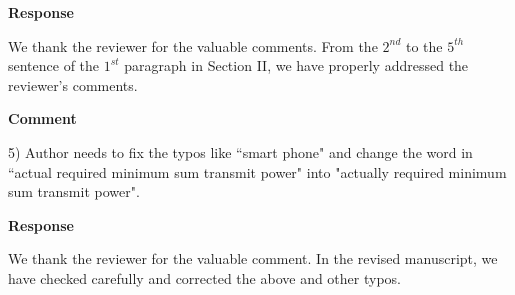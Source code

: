 \documentclass[12pt,draftcls, onecolumn]{IEEEtran}
\begin{document}
\vspace{3mm} \noindent\textcolor[rgb]{0.00,0.00,1.00}{\textbf{Response}}
\vspace{2mm}

We thank the reviewer for the valuable comments. From the $ 2^{nd} $ to the $ 5^{th} $ sentence of the $ 1^{st} $ paragraph in Section II, we have properly addressed the reviewer's comments.


\vspace{3mm}
\noindent\textcolor[rgb]{1.00,0.00,0.00}{\textbf{Comment}}
\vspace{3mm}

5) Author needs to fix the typos like ``smart phone" and change the word in ``actual required minimum sum transmit power" into "actually required minimum sum transmit power".


\vspace{3mm} \noindent\textcolor[rgb]{0.00,0.00,1.00}{\textbf{Response}}
\vspace{2mm}

We thank the reviewer for the valuable comment. In the revised manuscript, we have checked carefully and corrected the above and other typos. 

 
	
\end{document}
